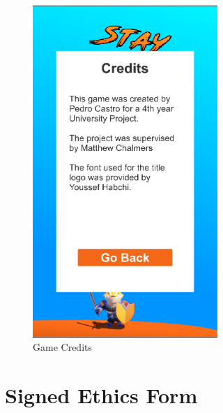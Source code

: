 \documentclass{dissertation}
\begin{document}
\begin{appendices}
\begin{figure}[H]
\centering
\includegraphics[width = 7cm]{images/final-ui8.png}
\caption{Game Credits}
\label{fig:f7}
\end{figure}

\chapter{Signed Ethics Form}


\end{appendices}
\end{document}
